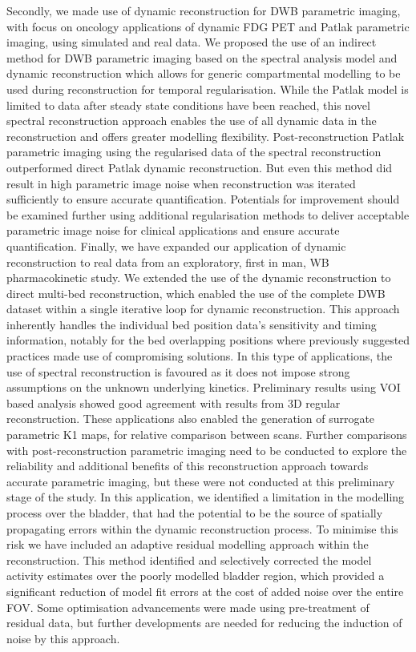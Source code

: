 Secondly, we made use of dynamic reconstruction for DWB parametric imaging, with focus on oncology applications of dynamic FDG PET and Patlak parametric imaging, using simulated and real data.
We proposed the use of an indirect method for DWB parametric imaging based on the spectral analysis model and dynamic reconstruction which allows for generic compartmental modelling to be used during reconstruction for temporal regularisation. While the Patlak model is limited to data after steady state conditions have been reached, this novel spectral reconstruction approach enables the use of all dynamic data in the reconstruction and offers greater modelling flexibility. Post-reconstruction Patlak parametric imaging using the regularised data of the spectral reconstruction outperformed direct Patlak dynamic reconstruction. But even this method did result in high parametric image noise when reconstruction was iterated sufficiently to ensure accurate quantification. Potentials for improvement should be examined further using additional regularisation methods to deliver acceptable parametric image noise for clinical applications and ensure accurate quantification.
Finally, we have expanded our application of dynamic reconstruction to real data from an exploratory, first in man, WB pharmacokinetic study. We extended the use of the dynamic reconstruction to direct multi-bed reconstruction, which enabled the use of the complete DWB dataset within a single iterative loop for dynamic reconstruction. This approach inherently handles the individual bed position data's sensitivity and timing information, notably for the bed overlapping positions where previously suggested practices made use of compromising solutions. In this type of applications, the use of spectral reconstruction is favoured as it does not impose strong assumptions on the unknown underlying kinetics. Preliminary results using VOI based analysis showed good agreement with results from 3D regular reconstruction. These applications also enabled the generation of surrogate parametric K1 maps, for relative comparison between scans.
Further comparisons with post-reconstruction parametric imaging need to be conducted to explore the reliability and additional benefits of this reconstruction approach towards accurate parametric imaging, but these were not conducted at this preliminary stage of the study.
In this application, we identified a limitation in the modelling process over the bladder, that had the potential to be the source of spatially propagating errors within the dynamic reconstruction process. 
To minimise this risk we have included an adaptive residual modelling approach within the reconstruction. This method identified and selectively corrected the model activity estimates over the poorly modelled bladder region, which provided a significant reduction of model fit errors at the cost of added noise over the entire FOV. Some optimisation advancements were made using pre-treatment of residual data, but further developments are needed for reducing the induction of noise by this approach. 

